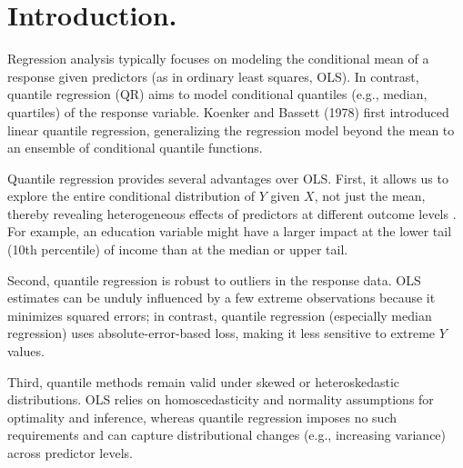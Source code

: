 \documentclass[fleqn,8pt]{latex/stylish_article} %
\affiliation{

}
\affiliation{*\textbf{Corresponding author}: , \url{https://www.uc3m.es}} %
\begin{document}

\flushbottom %

\maketitle %

\tableofcontents %

\thispagestyle{empty} %


\section{Introduction.}\label{introduction.}

Regression analysis typically focuses on modeling the conditional mean of a response given predictors (as in ordinary least squares, OLS). In contrast, quantile regression (QR) aims to model conditional quantiles (e.g., median, quartiles) of the response variable. Koenker and Bassett (1978) first introduced linear quantile regression, generalizing the regression model beyond the mean to an ensemble of conditional quantile functions.

Quantile regression provides several advantages over OLS. First, it allows us to explore the entire conditional distribution of \(Y\) given \(X\), not just the mean, thereby revealing heterogeneous effects of predictors at different outcome levels . For example, an education variable might have a larger impact at the lower tail (10th percentile) of income than at the median or upper tail.

Second, quantile regression is robust to outliers in the response data. OLS estimates can be unduly influenced by a few extreme observations because it minimizes squared errors; in contrast, quantile regression (especially median regression) uses absolute-error-based loss, making it less sensitive to extreme \(Y\) values.

Third, quantile methods remain valid under skewed or heteroskedastic distributions. OLS relies on homoscedasticity and normality assumptions for optimality and inference, whereas quantile regression imposes no such requirements and can capture distributional changes (e.g., increasing variance) across predictor levels.
\end{document}
